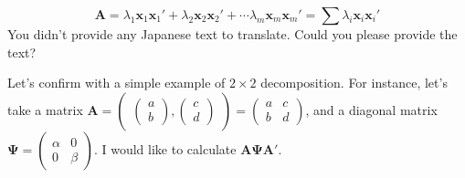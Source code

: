 \documentclass{ltjsbook}
\begin{document}
\[
	\bm{A}= \lambda_1 \bm{x}_1 \bm{x}_1' + \lambda_2 \bm{x}_2 \bm{x}_2' + \cdots \lambda_m \bm{x}_m \bm{x}_m'= \sum \lambda_{i} \bm{x}_{i} \bm{x}_i'
\]
You didn't provide any Japanese text to translate. Could you please provide the text?

Let's confirm with a simple example of $2 \times 2$ decomposition.
For instance, let's take a matrix $\bm{A} = \begin{pmatrix}\begin{pmatrix}a\\b\end{pmatrix},\begin{pmatrix}c\\d\end{pmatrix}\end{pmatrix}=\begin{pmatrix} a & c \\b & d\end{pmatrix}$, and a diagonal matrix $\bm{\Psi} = \begin{pmatrix}\alpha & 0 \\ 0 & \beta \end{pmatrix}$. I would like to calculate $\bm{A\Psi A}'$.
\end{document}
